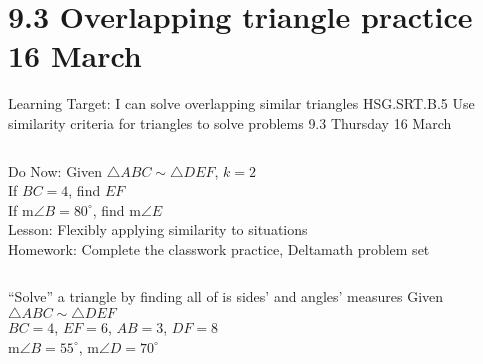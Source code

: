 \section{9.3 Overlapping triangle practice \hfill 16 March \,}
\begin{frame}{Learning Target: I can solve overlapping similar triangles}
  {HSG.SRT.B.5 Use similarity criteria for triangles to solve problems \hfill \alert{9.3 Thursday 16 March}}
  \begin{columns}
    Do Now: Given $\triangle ABC \sim \triangle DEF$, $k=2$ \\
    If $BC=4$, find $EF$ \\
    If m$\angle B = 80^\circ$, find m$\angle E$\\[0.5cm]
    Lesson: Flexibly applying similarity to situations \\[0.5cm]
    Homework: Complete the classwork practice, Deltamath problem set \\[0.5cm]
    \begin{flushright}
    \end{flushright}
  \end{columns}
\end{frame}

\begin{frame}{``Solve'' a triangle by finding all of is sides' and angles' measures}
    Given $\triangle ABC \sim \triangle DEF$ \\[0.2cm]
    $BC=4$, $EF=6$, $AB=3$, $DF=8$\\[0.2cm]
    m$\angle B = 55^\circ$, m$\angle D=70^\circ$\\[0.5cm]
    \begin{center}
    \end{center}
\end{frame}

